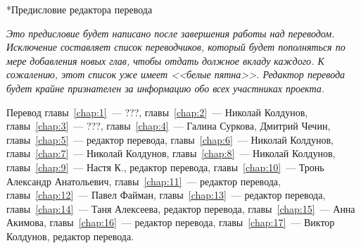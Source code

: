 
\begin{chapter}*{Предисловие редактора перевода}

\textit{Это предисловие будет написано после завершения работы над переводом.
Исключение составляет список переводчиков, который будет пополняться
по мере добавления новых глав, чтобы отдать должное вкладу каждого.
К сожалению, этот список уже имеет <<белые пятна>>. Редактор
перевода будет крайне признателен за информацию обо всех участниках проекта.}

\bigskip 

Перевод главы~\ref{chap:1}~--- ???, главы~\ref{chap:2}~--- Николай Колдунов,
главы~\ref{chap:3}~--- ???, главы~\ref{chap:4}~--- Галина Суркова, 
Дмитрий Чечин, главы~\ref{chap:5}~--- редактор перевода, 
главы~\ref{chap:6}~--- Николай Колдунов, 
главы~\ref{chap:7}~--- Николай Колдунов,
главы~\ref{chap:8}~--- Николай Колдунов,
главы~\ref{chap:9}~--- Настя К., редактор перевода,
главы~\ref{chap:10}~--- Тронь Александр Анатольевич,
главы~\ref{chap:11}~--- редактор перевода,
главы~\ref{chap:12}~--- Павел Файман,
главы~\ref{chap:13}~--- редактор перевода,
главы~\ref{chap:14}~--- Таня Алексеева, редактор перевода,
главы~\ref{chap:15}~--- Анна Акимова,
главы~\ref{chap:16}~--- редактор перевода,
главы~\ref{chap:17}~--- Виктор Колдунов, редактор перевода.
\end{chapter}